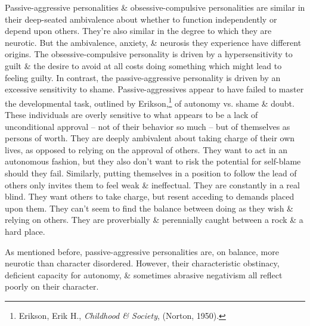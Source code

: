 \documentclass{article}
\numberwithin{equation}{section}
\begin{document}
Passive-aggressive personalities \& obsessive-compulsive personalities are similar in their deep-seated ambivalence about whether to function independently or depend upon others. They're also similar in the degree to which they are neurotic. But the ambivalence, anxiety, \& neurosis they experience have different origins. The obsessive-compulsive personality is driven by a hypersensitivity to guilt \& the desire to avoid at all costs doing something which might lead to feeling guilty. In contrast, the passive-aggressive personality is driven by an excessive sensitivity to shame. Passive-aggressives appear to have failed to master the developmental task, outlined by Erikson,\footnote{Erikson, Erik H., \textit{Childhood \& Society}, (Norton, 1950).} of autonomy vs. shame \& doubt. These individuals are overly sensitive to what appears to be a lack of unconditional approval -- not of their behavior so much -- but of themselves as persons of worth. They are deeply ambivalent about taking charge of their own lives, as opposed to relying on the approval of others. They want to act in an autonomous fashion, but they also don't want to risk the potential for self-blame should they fail. Similarly, putting themselves in a position to follow the lead of others only invites them to feel weak \& ineffectual. They are constantly in a real blind. They want others to take charge, but resent acceding to demands placed upon them. They can't seem to find the balance between doing as they wish \& relying on others. They are proverbially \& perennially caught between a rock \& a hard place.

As mentioned before, passive-aggressive personalities are, on balance, more neurotic than character disordered. However, their characteristic obstinacy, deficient capacity for autonomy, \& sometimes abrasive negativism all reflect poorly on their character.
\end{document}
